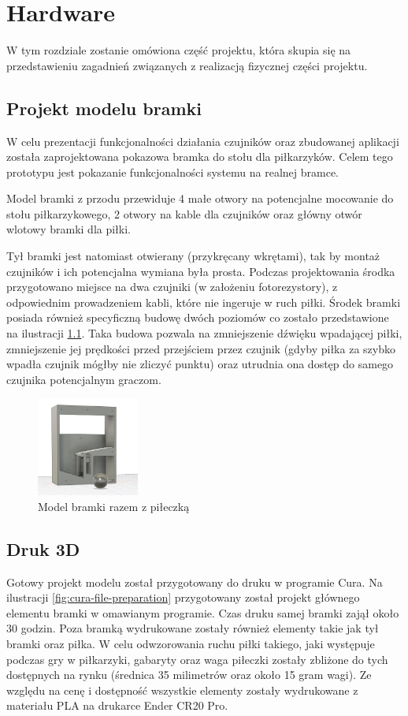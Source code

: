 \chapter{Hardware}
\label{ch:hardware}
W tym rozdziale zostanie omówiona część projektu, która skupia się na przedstawieniu zagadnień związanych z realizacją fizycznej części projektu.

\section{Projekt modelu bramki}
W celu prezentacji funkcjonalności działania czujników oraz zbudowanej aplikacji została zaprojektowana pokazowa bramka do stołu dla piłkarzyków. Celem tego prototypu jest pokazanie funkcjonalności systemu na realnej bramce.

Model bramki z przodu przewiduje 4 małe otwory na potencjalne mocowanie do stołu piłkarzykowego, 2 otwory na kable dla czujników oraz główny otwór wlotowy bramki dla piłki.

Tył bramki jest natomiast otwierany (przykręcany wkrętami), tak by montaż czujników i ich potencjalna wymiana była prosta. Podczas projektowania środka przygotowano miejsce na dwa czujniki (w założeniu fotorezystory), z odpowiednim prowadzeniem kabli, które nie ingeruje w ruch piłki. Środek bramki posiada również specyficzną budowę dwóch poziomów co zostało przedstawione na ilustracji \ref{fig:inside-of-gate-model}. Taka budowa pozwala na zmniejszenie dźwięku wpadającej piłki, zmniejszenie jej prędkości przed przejściem przez czujnik (gdyby piłka za szybko wpadła czujnik mógłby nie zliczyć punktu) oraz utrudnia ona dostęp do samego czujnika potencjalnym graczom.

\begin{figure}[h!]
  \centering
    \includegraphics[width=0.3\textwidth]{images/3D/gate_inside.png}
  \caption{Model bramki razem z piłeczką}
  \label{fig:inside-of-gate-model}
\end{figure}

\section{Druk 3D}
Gotowy projekt modelu został przygotowany do druku w programie Cura. Na ilustracji \ref{fig:cura-file-preparation} przygotowany został projekt głównego elementu bramki w omawianym programie. Czas druku samej bramki zajął około 30 godzin. Poza bramką wydrukowane zostały również elementy takie jak tył bramki oraz piłka. W celu odwzorowania ruchu piłki takiego, jaki występuje podczas gry w piłkarzyki, gabaryty oraz waga piłeczki zostały zbliżone do tych dostępnych na rynku (średnica 35 milimetrów oraz około 15 gram wagi). Ze względu na cenę i dostępność wszystkie elementy zostały wydrukowane z materiału PLA na drukarce Ender CR20 Pro.

